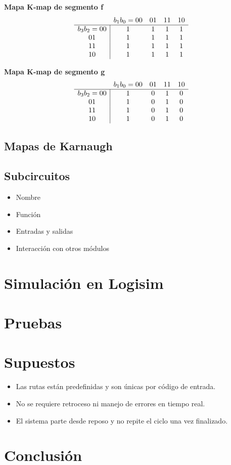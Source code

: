 \documentclass[12pt]{article}
\begin{document}
\noindent
\textbf{Mapa K‐map de segmento \textsf{f}}  
\[
\begin{array}{c|cccc}
\multicolumn{1}{c}{} & \multicolumn{1}{c}{b_1b_0=00} & \multicolumn{1}{c}{01} & \multicolumn{1}{c}{11} & \multicolumn{1}{c}{10} \\
\hline
b_3b_2=00 & 1 & 1 & 1 & 1 \\
01       & 1 & 1 & 1 & 1 \\
11       & 1 & 1 & 1 & 1 \\
10       & 1 & 1 & 1 & 1 \\
\end{array}
\]
\vspace{1em}

\noindent
\textbf{Mapa K‐map de segmento \textsf{g}}  
\[
\begin{array}{c|cccc}
\multicolumn{1}{c}{} & \multicolumn{1}{c}{b_1b_0=00} & \multicolumn{1}{c}{01} & \multicolumn{1}{c}{11} & \multicolumn{1}{c}{10} \\
\hline
b_3b_2=00 & 1 & 0 & 1 & 0 \\
01       & 1 & 0 & 1 & 0 \\
11       & 1 & 0 & 1 & 0 \\
10       & 1 & 0 & 1 & 0 \\
\end{array}
\]
\vspace{1em}

\noindent

\subsection{Mapas de Karnaugh}

\subsection{Subcircuitos}

\begin{itemize}
    \item Nombre
    \item Función
    \item Entradas y salidas
    \item Interacción con otros módulos
\end{itemize}

\section{Simulación en Logisim}

\section{Pruebas}

\section{Supuestos}
\begin{itemize}
    \item Las rutas están predefinidas y son únicas por código de entrada.
    \item No se requiere retroceso ni manejo de errores en tiempo real.
    \item El sistema parte desde reposo y no repite el ciclo una vez finalizado.
\end{itemize}

\section{Conclusión}
\end{document}
